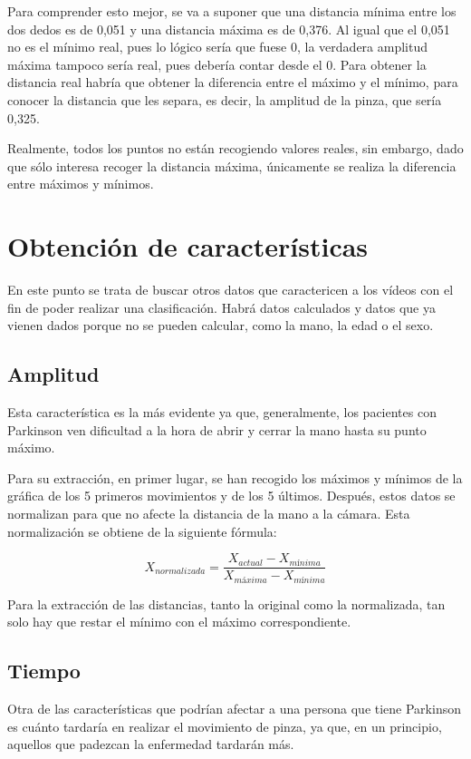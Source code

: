 Para comprender esto mejor, se va a suponer que una distancia mínima entre los dos dedos es de 0,051 y una distancia máxima es de 0,376. Al igual que el 0,051 no es el mínimo real, pues lo lógico sería que fuese 0, la verdadera amplitud máxima tampoco sería real, pues debería contar desde el 0. Para obtener la distancia real habría que obtener la diferencia entre el máximo y el mínimo, para conocer la distancia que les separa, es decir, la amplitud de la pinza, que sería 0,325. 

Realmente, todos los puntos no están recogiendo valores reales, sin embargo, dado que sólo interesa recoger la distancia máxima, únicamente se realiza la diferencia entre máximos y mínimos.

\section{Obtención de características}
En este punto se trata de buscar otros datos que caractericen a los vídeos con el fin de poder realizar una clasificación. Habrá datos calculados y datos que ya vienen dados porque no se pueden calcular, como la mano, la edad o el sexo.

\subsection{Amplitud}
Esta característica es la más evidente ya que, generalmente, los pacientes con Parkinson ven dificultad a la hora de abrir y cerrar la mano hasta su punto máximo.

Para su extracción, en primer lugar, se han recogido los máximos y mínimos de la gráfica de los 5 primeros movimientos y de los 5 últimos. Después, estos datos se normalizan para que no afecte la distancia de la mano a la cámara. Esta normalización se obtiene de la siguiente fórmula:

\begin{equation}
	X_{normalizada} = \frac{X_{actual} - X_{mínima}}{X_{máxima}-X_{mínima}}
\end{equation}

Para la extracción de las distancias, tanto la original como la normalizada, tan solo hay que restar el mínimo con el máximo correspondiente. 

\subsection{Tiempo}
Otra de las características que podrían afectar a una persona que tiene Parkinson es cuánto tardaría en realizar el movimiento de pinza, ya que, en un principio, aquellos que padezcan la enfermedad tardarán más.

